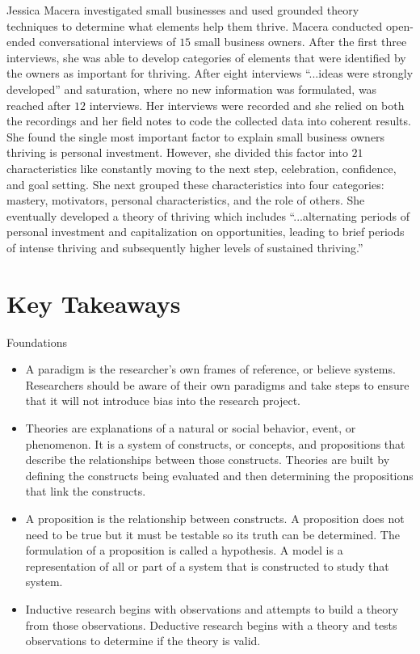 Jessica Macera investigated small businesses and used grounded theory techniques to determine what elements help them thrive\cite{macera2016theory}. Macera conducted open-ended conversational interviews of $ 15 $ small business owners. After the first three interviews, she was able to develop categories of elements that were identified by the owners as important for thriving. After eight interviews ``...ideas were strongly developed'' and saturation, where no new information was formulated, was reached after $ 12 $ interviews. Her interviews were recorded and she relied on both the recordings and her field notes to code the collected data into coherent results. She found the single most important factor to explain small business owners thriving is personal investment. However, she divided this factor into $ 21 $ characteristics like constantly moving to the next step, celebration, confidence, and goal setting. She next grouped these characteristics into four categories: mastery, motivators, personal characteristics, and the role of others. She eventually developed a theory of thriving which includes ``...alternating periods of personal investment and capitalization on opportunities, leading to brief periods of intense thriving and subsequently higher levels of sustained thriving.''

\section{Key Takeaways}

\begin{center}
	\begin{tkawybox}{Foundations}
		\begin{itemize}
			\setlength{\itemsep}{0pt}
			\setlength{\parskip}{0pt}
			\setlength{\parsep}{0pt}
			
			\item A paradigm is the researcher's own frames of reference, or believe systems. Researchers should be aware of their own paradigms and take steps to ensure that it will not introduce bias into the research project.
			\item Theories are explanations of a natural or social behavior, event, or phenomenon. It is a system of constructs, or concepts, and propositions that describe the relationships between those constructs. Theories are built by defining the constructs being evaluated and then determining the propositions that link the constructs.
			\item A proposition is the relationship between constructs. A proposition does not need to be true but it must be testable so its truth can be determined. The formulation of a proposition is called a hypothesis. A model is a representation of all or part of a system that is constructed to study that system. 
			\item Inductive research begins with observations and attempts to build a theory from those observations. Deductive research begins with a theory and tests observations to determine if the theory is valid.
		\end{itemize}
	\end{tkawybox}
\end{center}

